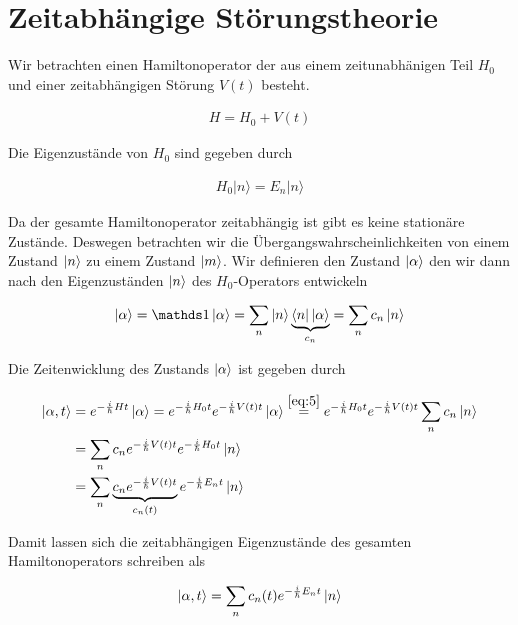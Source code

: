 





\section*{Zeitabhängige Störungstheorie}

Wir betrachten einen Hamiltonoperator der aus einem zeitunabhänigen Teil \(H_0\) und einer zeitabhängigen Störung \(V(t)\) besteht.

\begin{align}
  \label{eq:2}
  H=H_0+V(t)
\end{align}

Die Eigenzustände von \(H_0\) sind gegeben durch

\begin{align}
  \label{eq:1}
   H_0 |n\rangle = E_n|n\rangle
\end{align}

Da der gesamte Hamiltonoperator zeitabhängig ist gibt es keine stationäre Zustände. Deswegen betrachten wir die Übergangswahrscheinlichkeiten von einem Zustand \(\left| n \right\rangle\) zu einem Zustand \(\left| m \right\rangle\). Wir definieren den Zustand \(\left| \alpha \right\rangle\) den wir dann nach den Eigenzuständen \(\left| n \right\rangle\) des \(H_0\)-Operators entwickeln

\begin{align}
  \label{eq:5}
  \ket{\alpha} = \mathds 1 \ket{\alpha} = \sum_n \ket{n}\underbr{\bra{n} \ket{\alpha}}_{c_n} = \sum_n c_n \ket{n}
\end{align}

Die Zeitenwicklung des Zustands \(\left| \alpha \right\rangle\) ist gegeben durch

\begin{align}
  \label{eq:6}
  \ket{\alpha,t} &= e^{-\frac{i}{\hbar}Ht}\ket{\alpha} =  e^{-\frac{i}{\hbar}H_0t} e^{-\frac{i}{\hbar}V(t)t}\ket{\alpha} \stackrel{\eqref{eq:5}}= e^{-\frac{i}{\hbar}H_0t} e^{-\frac{i}{\hbar}V(t)t} \sum_n c_n \ket{n} \\
&=\sum_n c_n  e^{-\frac{i}{\hbar}V(t)t} e^{-\frac{i}{\hbar}H_0t} \ket{n} \\
&=\sum_n \underbr{c_n  e^{-\frac{i}{\hbar}V(t)t} }_{c_n(t)}e^{-\frac{i}{\hbar}E_nt} \ket{n}
\end{align}

Damit lassen sich die zeitabhängigen Eigenzustände des gesamten Hamiltonoperators schreiben als

\begin{align}
  \label{eq:7}
 \left| \alpha,t \right\rangle =\sum_n c_n(t) e^{-\frac{i}{\hbar}E_nt} \left| n \right\rangle 
\end{align}

